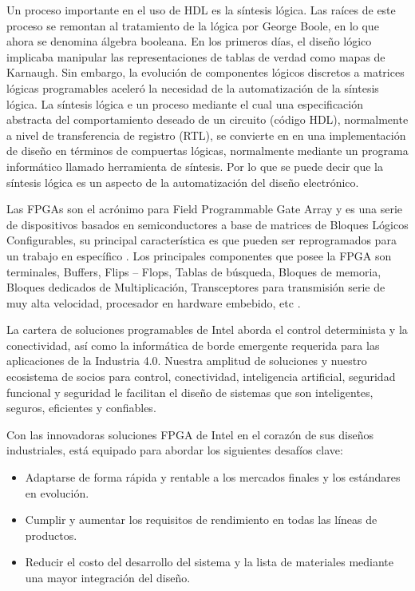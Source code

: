 \documentclass[journal]{IEEEtran}
\begin{document}
	\vspace{4mm}
	
	Un proceso importante en el uso de HDL es la síntesis lógica. Las raíces de este proceso se remontan al tratamiento de la lógica por George Boole, en lo que ahora se denomina álgebra booleana. En los primeros días, el diseño lógico implicaba manipular las representaciones de tablas de verdad como mapas de Karnaugh.
	Sin embargo, la evolución de componentes lógicos discretos a matrices lógicas programables aceleró la necesidad de la automatización de la síntesis lógica. 
	La síntesis lógica e un proceso mediante el cual una especificación abstracta del comportamiento deseado de un circuito (código HDL), normalmente a nivel de transferencia de registro (RTL), se convierte en en una implementación de diseño en términos de compuertas lógicas, normalmente mediante un programa informático llamado herramienta de síntesis.
	Por lo que se puede decir que la síntesis lógica es un aspecto de la automatización del diseño electrónico.
	
	\vspace{4mm}
	
	Las FPGAs son el acrónimo para Field Programmable Gate Array y es una serie de dispositivos basados en semiconductores a base de matrices de Bloques Lógicos Configurables, su principal característica es que pueden ser reprogramados para un trabajo en específico \cite{Lopez2020}. Los principales componentes que posee la FPGA son terminales, Buffers, Flips – Flops, Tablas de búsqueda, Bloques de memoria, Bloques dedicados de Multiplicación, Transceptores para transmisión serie de muy alta velocidad, procesador en hardware embebido, etc \cite{Sisterna}.
	
	\vspace{4mm}
	
	La cartera de soluciones programables de Intel aborda el control determinista y la conectividad, así como la informática de borde emergente requerida para las aplicaciones de la Industria 4.0. Nuestra amplitud de soluciones y nuestro ecosistema de socios para control, conectividad, inteligencia artificial, seguridad funcional y seguridad le facilitan el diseño de sistemas que son inteligentes, seguros, eficientes y confiables.
	
	Con las innovadoras soluciones FPGA de Intel en el corazón de sus diseños industriales, está equipado para abordar los siguientes desafíos clave:
	\begin{itemize}
		\item  Adaptarse de forma rápida y rentable a los mercados finales y los estándares en evolución.
		\item  Cumplir y aumentar los requisitos de rendimiento en todas las líneas de productos.
		\item  Reducir el costo del desarrollo del sistema y la lista de materiales mediante una mayor integración del diseño. 
	\end{itemize}
	
\end{document}
